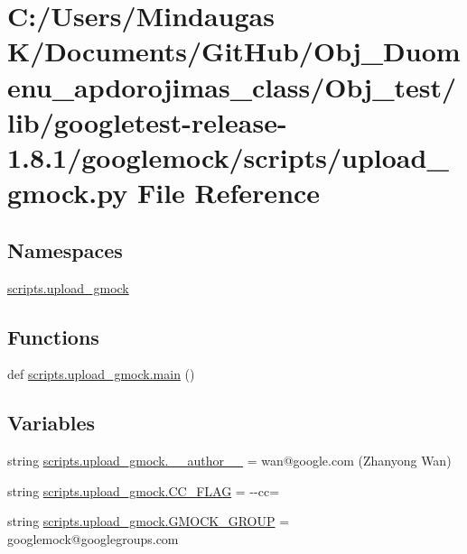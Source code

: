 \hypertarget{_obj__test_2lib_2googletest-release-1_88_81_2googlemock_2scripts_2upload__gmock_8py}{}\section{C\+:/\+Users/\+Mindaugas K/\+Documents/\+Git\+Hub/\+Obj\+\_\+\+Duomenu\+\_\+apdorojimas\+\_\+class/\+Obj\+\_\+test/lib/googletest-\/release-\/1.8.1/googlemock/scripts/upload\+\_\+gmock.py File Reference}
\label{_obj__test_2lib_2googletest-release-1_88_81_2googlemock_2scripts_2upload__gmock_8py}
\subsection*{Namespaces}
\begin{DoxyCompactItemize}
\item 
 \mbox{\hyperlink{namespacescripts_1_1upload__gmock}{scripts.\+upload\+\_\+gmock}}
\end{DoxyCompactItemize}
\subsection*{Functions}
\begin{DoxyCompactItemize}
\item 
def \mbox{\hyperlink{namespacescripts_1_1upload__gmock_aeba19746301ef94c6f4f2d85c8cbf394}{scripts.\+upload\+\_\+gmock.\+main}} ()
\end{DoxyCompactItemize}
\subsection*{Variables}
\begin{DoxyCompactItemize}
\item 
string \mbox{\hyperlink{namespacescripts_1_1upload__gmock_a6356e02cc4f41cbcf65975b477a22a05}{scripts.\+upload\+\_\+gmock.\+\_\+\+\_\+author\+\_\+\+\_\+}} = \textquotesingle{}wan@google.\+com (Zhanyong Wan)\textquotesingle{}
\item 
string \mbox{\hyperlink{namespacescripts_1_1upload__gmock_a3252fcbff5897e72a08c4b769431035f}{scripts.\+upload\+\_\+gmock.\+C\+C\+\_\+\+F\+L\+AG}} = \textquotesingle{}-\/-\/cc=\textquotesingle{}
\item 
string \mbox{\hyperlink{namespacescripts_1_1upload__gmock_a0a695586608d9b8356bc19eaa383cc8f}{scripts.\+upload\+\_\+gmock.\+G\+M\+O\+C\+K\+\_\+\+G\+R\+O\+UP}} = \textquotesingle{}googlemock@googlegroups.\+com\textquotesingle{}
\end{DoxyCompactItemize}
